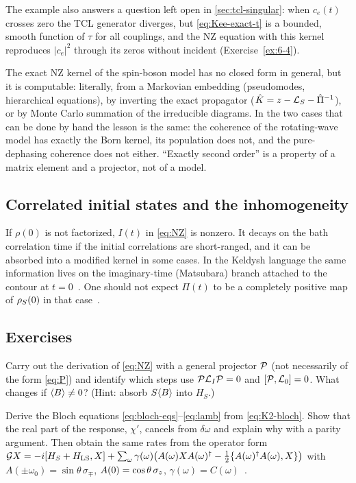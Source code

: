 The example also answers a question left open in \cref{sec:tcl-singular}: when $c_e(t)$ crosses zero the TCL generator diverges, but \cref{eq:Kee-exact-t} is a bounded, smooth function of $\tau$ for all couplings, and the NZ equation with this kernel reproduces $|c_e|^2$ through its zeros without incident (Exercise~\ref{ex:6-4}).

\begin{keybox}
The exact NZ kernel of the spin-boson model has no closed form in general, but it is computable: literally, from a Markovian embedding (pseudomodes, hierarchical equations), by inverting the exact propagator ($\hat K=z-\mathcal{L}_S-\hat\Pi^{-1}$), or by Monte Carlo summation of the irreducible diagrams.
In the two cases that can be done by hand the lesson is the same: the coherence of the rotating-wave model has exactly the Born kernel, its population does not, and the pure-dephasing coherence does not either.
``Exactly second order'' is a property of a matrix element and a projector, not of a model.
\end{keybox}

\subsection{Correlated initial states and the inhomogeneity}
\label{sec:nz-inhom}

If $\rho(0)$ is not factorized, $I(t)$ in \cref{eq:NZ} is nonzero.
It decays on the bath correlation time if the initial correlations are short-ranged, and it can be absorbed into a modified kernel in some cases.
In the Keldysh language the same information lives on the imaginary-time (Matsubara) branch attached to the contour at $t=0$~\cite[Ch.~4]{StefanucciVanLeeuwen}.
One should not expect $\Pi(t)$ to be a completely positive map of $\rho_{S}(0)$ in that case~\cite{Pechukas1994}.

\subsection{Exercises}

\begin{exercise}\label{ex:5-1}
Carry out the derivation of \cref{eq:NZ} with a general projector $\mathcal{P}$ (not necessarily of the form \eqref{eq:P}) and identify which steps use $\mathcal{P}\mathcal{L}_I\mathcal{P}=0$ and $[\mathcal{P},\mathcal{L}_0]=0$.
What changes if $\langle B\rangle\ne0$?
(Hint: absorb $S\langle B\rangle$ into $H_S$.)
\end{exercise}

\begin{exercise}\label{ex:5-2}
Derive the Bloch equations \eqref{eq:bloch-eqs}--\eqref{eq:lamb} from \cref{eq:K2-bloch}.
Show that the real part of the response, $\chi'$, cancels from $\delta\omega$ and explain why with a parity argument.
Then obtain the same rates from the operator form $\mathcal{G} X=-i[H_S+H_{\rm LS},X]+\sum_\omega\gamma(\omega)\big(A(\omega)XA(\omega)^\dagger-\tfrac12\{A(\omega)^\dagger A(\omega),X\}\big)$ with $A(\pm\omega_0)=\sin\theta\,\sigma_\mp$, $A(0)=\cos\theta\,\sigma_z$, $\gamma(\omega)=C(\omega)$~\cite[Sec.~3.3.1]{BreuerPetruccione}.
\end{exercise}

